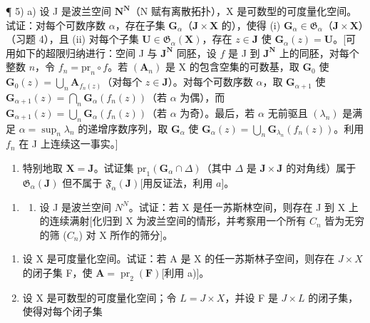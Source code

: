 ¶ 5) a) 设 J 是波兰空间 \(\mathbf{N}^{\mathbf{N}}\)（N 赋有离散拓扑），X 是可数型的可度量化空间。试证：对每个可数序数 \(\alpha\)，存在子集 \(\mathbf{G}_{\alpha}\)（\(\mathbf{J} \times \mathbf{X}\) 的），使得 (i) \(\mathbf{G}_{\alpha} \in \mathfrak{G}_{\alpha}\)（\(\mathbf{J} \times \mathbf{X}\)）（习题 4），且 (ii) 对每个子集 \(\mathbf{U} \in \mathfrak{G}_{\alpha}(\mathbf{X})\)，存在 \(z \in \mathbf{J}\) 使 \(\mathbf{G}_{\alpha}(z) = \mathbf{U}\)。{[}可用如下的超限归纳进行：空间 J 与 \(\mathbf{J}^{\mathbf{N}}\) 同胚，设 \(f\) 是 J 到 \(\mathbf{J}^{\mathbf{N}}\) 上的同胚，对每个整数 \(n\)，令 \(f_{n} = \mathrm{pr}_{n} \circ f\)。若 \((\mathbf{A}_{n})\) 是 X 的包含空集的可数基，取 \(\mathbf{G}_{0}\) 使 \(\mathbf{G}_{0}(z) = \bigcup_{n} \mathbf{A}_{f_{n}(z)}\)（对每个 \(z \in \mathbf{J}\)）。对每个可数序数 \(\alpha\)，取 \(\mathbf{G}_{\alpha+1}\) 使 \(\mathbf{G}_{\alpha+1}(z) = \bigcap_{n} \mathbf{G}_{\alpha}(f_{n}(z))\)（若 \(\alpha\) 为偶），而 \(\mathbf{G}_{\alpha+1}(z) = \bigcup_{n} \mathbf{G}_{\alpha}(f_{n}(z))\)（若 \(\alpha\) 为奇）。最后，若 \(\alpha\) 无前驱且 \((\lambda_{n})\) 是满足 \(\alpha = \sup_{n} \lambda_{n}\) 的递增序数序列，取 \(\mathbf{G}_{\alpha}\) 使 \(\mathbf{G}_{\alpha}(z) = \bigcup_{n} \mathbf{G}_{\lambda_{n}}(f_{n}(z))\)。利用 \(f_{n}\) 在 J 上连续这一事实。{]}

\begin{enumerate}
\def\labelenumi{\alph{enumi})}
\setcounter{enumi}{1}
\tightlist
\item
  特别地取 \(\mathbf{X} = \mathbf{J}\)。试证集 \(\mathrm{pr}_1(\mathbf{G}_\alpha \cap \Delta)\)（其中 \(\Delta\) 是 \(\mathbf{J} \times \mathbf{J}\) 的对角线）属于 \(\mathfrak{G}_{\alpha}(\mathbf{J})\) 但不属于 \(\mathfrak{F}_{\alpha}(\mathbf{J})\){[}用反证法，利用 \(a\){]}。
\end{enumerate}

\begin{enumerate}
\def\labelenumi{\arabic{enumi})}
\setcounter{enumi}{5}
\tightlist
\item
  \begin{enumerate}
  \def\labelenumii{\alph{enumii})}
  \tightlist
  \item
    设 J 是波兰空间 \(N^{N}\)。试证：若 X 是任一苏斯林空间，则存在 J 到 X 上的连续满射{[}化归到 X 为波兰空间的情形，并考察用一个所有 \(C_{n}\) 皆为无穷的筛 (\(C_{n}\)) 对 X 所作的筛分{]}。
  \end{enumerate}
\end{enumerate}

\begin{enumerate}
\def\labelenumi{\alph{enumi})}
\setcounter{enumi}{1}
\item
  设 X 是可度量化空间。试证：若 A 是 X 的任一苏斯林子空间，则存在 \(J \times X\) 的闭子集 F，使 \(\mathbf{A} = \operatorname{pr}_{2}(\mathbf{F})\){[}利用 a){]}。
\item
  设 X 是可数型的可度量化空间；令 \(L = J \times X\)，并设 F 是 \(J \times L\) 的闭子集，使得对每个闭子集
\end{enumerate}

